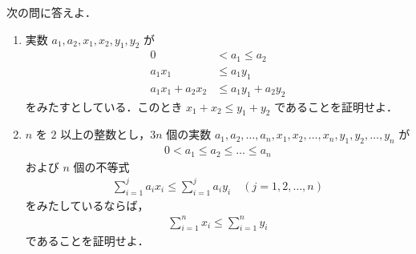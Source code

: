 \documentclass[../../main.tex]{subfiles}
\begin{document}
次の問に答えよ．
\begin{enumerate}
  \item 実数 $a_1, a_2, x_1, x_2, y_1, y_2$ が
    \begin{align} 0 &< a_1 \le a_2 \\ a_1 x_1 &\le a_1 y_1 \\ a_1 x_1 + a_2 x_2 &\le a_1 y_1 + a_2 y_2
    \end{align}
    をみたすとしている．このとき $x_1 + x_2 \le y_1 + y_2$ であることを証明せよ．
  \item $n$ を $2$ 以上の整数とし，$3n$ 個の実数 $a_1, a_2, \dots, a_n, x_1, x_2, \dots, x_n, y_1, y_2, \dots, y_n$ が
    \begin{align}
      0 < a_1 \le a_2 \le \dots \le a_n
    \end{align}
    および $n$ 個の不等式
    \begin{align}
      \sum_{i=1}^j a_i x_i \le \sum_{i=1}^j a_i y_i \quad (j=1, 2, \dots, n)
    \end{align}
    をみたしているならば，
    \begin{align}
      \sum_{i=1}^n x_i \le \sum_{i=1}^n y_i
    \end{align}
    であることを証明せよ．
\end{enumerate}
\end{document}
